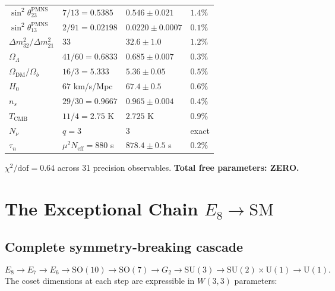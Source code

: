 \documentclass[12pt,a4paper]{article}
\theoremstyle{definition}
\newcommand{\SU}{\mathrm{SU}}
\newcommand{\SO}{\mathrm{SO}}
\newcommand{\Neff}{N_{\mathrm{eff}}}
\begin{document}
\begin{center}
\begin{longtable}{@{}llll@{}}
$\sin^2\theta_{23}^{\text{PMNS}}$ & $7/13=0.5385$ & $0.546\pm 0.021$ & $1.4\%$ \\
$\sin^2\theta_{13}^{\text{PMNS}}$ & $2/91=0.02198$ & $0.0220\pm 0.0007$ & $0.1\%$ \\
$\Delta m^2_{32}/\Delta m^2_{21}$ & $33$ & $32.6\pm 1.0$ & $1.2\%$ \\
$\Omega_\Lambda$ & $41/60=0.6833$ & $0.685\pm 0.007$ & $0.3\%$ \\
$\Omega_{\text{DM}}/\Omega_b$ & $16/3=5.333$ & $5.36\pm 0.05$ & $0.5\%$ \\
$H_0$ & $67$ km/s/Mpc & $67.4\pm 0.5$ & $0.6\%$ \\
$n_s$ & $29/30=0.9667$ & $0.965\pm 0.004$ & $0.4\%$ \\
$T_{\text{CMB}}$ & $11/4=2.75$ K & $2.725$ K & $0.9\%$ \\
$N_\nu$ & $q=3$ & $3$ & exact \\
$\tau_n$ & $\mu^2\Neff=880$ s & $878.4\pm 0.5$ s & $0.2\%$ \\
\end{longtable}
\end{center}

\noindent $\chi^2/\mathrm{dof} = 0.64$ across 31 precision observables.
\textbf{Total free parameters: ZERO.}


\section{The Exceptional Chain \texorpdfstring{$E_8\to\mathrm{SM}$}{E8 -> SM}}
\label{sec:exceptional_chain}

\subsection{Complete symmetry-breaking cascade}

\begin{equation}
  \label{eq:breaking}
  E_8 \to E_7 \to E_6 \to \SO(10) \to \SO(7)
      \to G_2 \to \SU(3) \to \SU(2)\times\mathrm{U}(1) \to \mathrm{U}(1).
\end{equation}
The coset dimensions at each step are expressible in $W(3,3)$ parameters:
\end{document}
